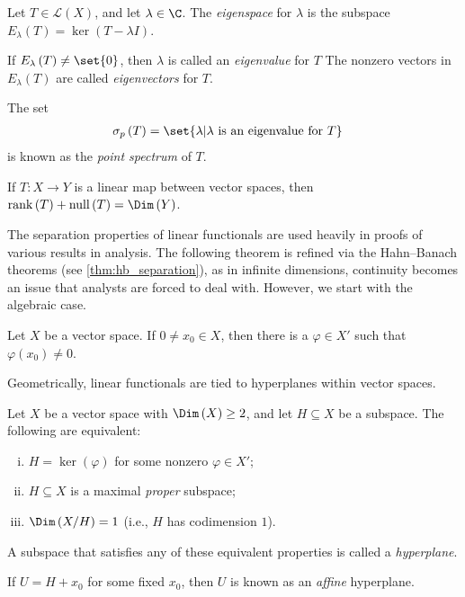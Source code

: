 \begin{definition}
  Let $T\in \mathcal{L}\left(X\right)$, and let $\lambda\in \C$. The \textit{eigenspace} for $\lambda$ is the subspace $E_{\lambda}\left(T\right) = \ker\left(T - \lambda I\right)$.\newline

  If $E_{\lambda}\left(T\right) \neq \set{0}$, then $\lambda$ is called an \textit{eigenvalue} for $T$ The nonzero vectors in $E_{\lambda}\left(T\right)$ are called \textit{eigenvectors} for $T$.\newline

  The set
  \begin{align*}
    \sigma_p\left(T\right) &= \set{\lambda | \lambda\text{ is an eigenvalue for }T}
  \end{align*}
  is known as the \textit{point spectrum} of $T$.
\end{definition}
\begin{theorem}
  If $T\colon X\rightarrow Y$ is a linear map between vector spaces, then $\operatorname{rank}\left(T\right) + \operatorname{null}\left(T\right) = \Dim\left(Y\right)$.
\end{theorem}
The separation properties of linear functionals are used heavily in proofs of various results in analysis. The following theorem is refined via the Hahn--Banach theorems (see \ref{thm:hb_separation}), as in infinite dimensions, continuity becomes an issue that analysts are forced to deal with. However, we start with the algebraic case.
\begin{proposition}
  Let $X$ be a vector space. If $0\neq x_0\in X$, then there is a $\varphi\in X'$ such that $\varphi\left(x_0\right) \neq 0$.
\end{proposition}
Geometrically, linear functionals are tied to hyperplanes within vector spaces.
\begin{proposition}
  Let $X$ be a vector space with $\Dim\left(X\right) \geq 2$, and let $H\subseteq X$ be a subspace. The following are equivalent:
  \begin{enumerate}[(i)]
    \item $H=\ker\left(\varphi\right)$ for some nonzero $\varphi\in X'$;
    \item $H\subseteq X$ is a maximal \textit{proper} subspace;
    \item $\Dim\left(X/H\right) = 1$ (i.e., $H$ has codimension $1$).
  \end{enumerate}
\end{proposition}
\begin{definition}\label{def:hyperplane}
  A subspace that satisfies any of these equivalent properties is called a \textit{hyperplane}.\newline

  If $U = H + x_0$ for some fixed $x_0$, then $U$ is known as an \textit{affine} hyperplane.
\end{definition}
